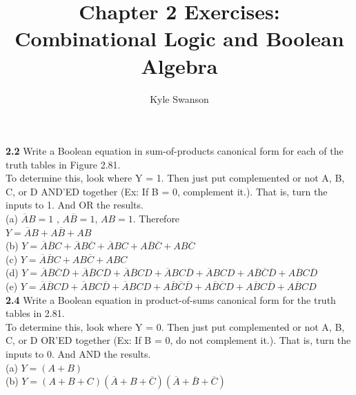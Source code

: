 \documentclass[12pt,a4paper]{report}
\author{Kyle Swanson}
\title{Chapter 2 Exercises: Combinational Logic and Boolean Algebra }
\newcommand*{\al}{\overline{A}}
\begin{document}
\maketitle

\begin{normalsize}

\textbf{2.2} Write a Boolean equation in sum-of-products canonical form for each of the truth tables in Figure 2.81. \\

To determine this, look where Y = 1. Then just put complemented or not A, B, C, or D AND'ED together (Ex: If B = 0, complement it.). That is, turn the inputs to 1. And OR the results. \\

(a) $ \al{}B = 1 $ , $ A\overline{B} = 1 $, $ AB = 1 $. Therefore \\ 
$ Y = \overline{A}B + A\overline{B} + AB $ \\

(b) $ Y = \overline{A}\overline{B}C + \overline{A}B\overline{C} + \overline{A}BC + A\overline{B}\overline{C} + AB\overline{C}$ \\

(c) $ Y = \overline{A}\overline{B}C + AB\overline{C} + ABC $ \\

(d) $ Y = \overline{A}\overline{B}\overline{C}\overline{D} + \overline{A}\overline{B}C\overline{D} + \overline{A}\overline{B}CD + \overline{A}BC\overline{D} + \overline{A}BCD + A\overline{B}\overline{C}\overline{D} + A\overline{B}C\overline{D} $ \\

(e) $ Y = \overline{A}\overline{B}CD + \overline{A}BC\overline{D} + \overline{A}BCD + A\overline{B}\overline{C}\overline{D} + A\overline{B}\overline{C}D + A\overline{B}C\overline{D} + A\overline{B}CD $ \\

\textbf{2.4} Write a Boolean equation in product-of-sums canonical form for the truth tables in 2.81. \\

To determine this, look where Y = 0. Then just put complemented or not A, B, C, or D OR'ED together (Ex: If B = 0, do not complement it.). That is, turn the inputs to 0. And AND the results. \\

(a) $ Y = (A + B) $ \\

(b) $ Y = (A + B + C) (\overline{A} + B + \overline{C}) (\overline{A} + \overline{B} + \overline{C}) $ \\


\end{normalsize}
\end{document}
